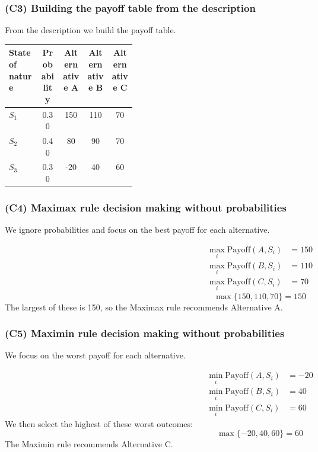 \subsubsection{(C3) Building the payoff table from the description}\label{subsubsec:example1-1-c3}

From the description we build the payoff table.

\begin{center}
	\begin{tabularx}{\linewidth}{@{}L{0.25\linewidth}C C C C@{}}
		\toprule
		State of nature & Probability & Alternative A & Alternative B & Alternative C \\
		\midrule
		\(S_1\) & 0.30 & 150 & 110 & 70 \\
		\(S_2\) & 0.40 & 80 & 90 & 70 \\
		\(S_3\) & 0.30 & -20 & 40 & 60 \\
		\bottomrule
	\end{tabularx}
\end{center}

\subsubsection{(C4) Maximax rule decision making without probabilities}\label{subsubsec:example1-1-c4}

We ignore probabilities and focus on the best payoff for each alternative.

\[
\begin{aligned}
\max_i \text{Payoff}(A, S_i) &= 150\\
\max_i \text{Payoff}(B, S_i) &= 110\\
\max_i \text{Payoff}(C, S_i) &= 70
\end{aligned}
\]
\[
\max\{150, 110, 70\} = 150
\]
The largest of these is 150, so the Maximax rule recommends Alternative A.

\subsubsection{(C5) Maximin rule decision making without probabilities}\label{subsubsec:example1-1-c5}

We focus on the worst payoff for each alternative.

\[
\begin{aligned}
\min_i \text{Payoff}(A, S_i) &= -20\\
\min_i \text{Payoff}(B, S_i) &= 40\\
\min_i \text{Payoff}(C, S_i) &= 60
\end{aligned}
\]
We then select the highest of these worst outcomes:
\[
\max\{-20, 40, 60\} = 60
\]
The Maximin rule recommends Alternative C.


